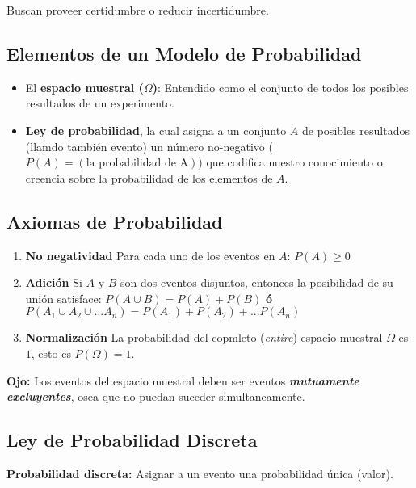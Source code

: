 \documentclass[]{book}
\providecommand{\tightlist}{%
  \setlength{\itemsep}{0pt}\setlength{\parskip}{0pt}}
\begin{document}
Buscan proveer certidumbre o reducir incertidumbre.

\subsection{Elementos de un Modelo de
Probabilidad}\label{elementos-de-un-modelo-de-probabilidad-1}

\begin{itemize}
\tightlist
\item
  El \textbf{espacio muestral (\(\Omega\))}: Entendido como el conjunto
  de todos los posibles resultados de un experimento.
\item
  \textbf{Ley de probabilidad}, la cual asigna a un conjunto \(A\) de
  posibles resultados (llamdo también evento) un número no-negativo
  (\(P(A) = (\text{la probabilidad de A})\)) que codifica nuestro
  conocimiento o creencia sobre la probabilidad de los elementos de
  \(A\).
\end{itemize}

\subsection{Axiomas de Probabilidad}\label{axiomas-de-probabilidad-1}

\begin{enumerate}
\def\labelenumi{\arabic{enumi}.}
\tightlist
\item
  \textbf{No negatividad} Para cada uno de los eventos en \(A\):
  \(P(A) \geq 0\)
\item
  \textbf{Adición} Si \(A\) y \(B\) son dos eventos disjuntos, entonces
  la posibilidad de su unión satisface: \(P(A \cup B) = P(A)+P(B)\)
  \textbf{ó} \(P(A_1\cup A_2 \cup ...A_n) = P(A_1) + P(A_2)+...P(A_n)\)
\item
  \textbf{Normalización} La probabilidad del copmleto (\emph{entire})
  espacio muestral \(\Omega\) es \(1\), esto es \(P(\Omega) = 1\).
\end{enumerate}

 \textbf{Ojo:} Los eventos del espacio muestral deben ser eventos
\textbf{\emph{mutuamente excluyentes}}, osea que no puedan suceder
simultaneamente.

\subsection{Ley de Probabilidad
Discreta}\label{ley-de-probabilidad-discreta-1}

\textbf{Probabilidad discreta:} Asignar a un evento una probabilidad
única (valor).
\end{document}
